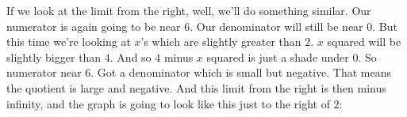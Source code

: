 \documentclass[pdftex, brazil, 12pt, twoside]{article}
\begin{document}
\begin{figure}[H]
  \begin{center}
  \end{center}
\end{figure}

If we look at the limit from the right,
well, we'll do something similar.
Our numerator is again going to be near $6$.
Our denominator will still be near $0$.
But this time we're looking at $x$'s which
are slightly greater than $2$.
$x$ squared will be slightly bigger than $4$.
And so $4$ minus $x$ squared is just a shade under $0$.
So numerator near $6$.
Got a denominator which is small but negative.
That means the quotient is large and negative.
And this limit from the right is then minus infinity,
and the graph is going to look like this just
to the right of $2$:

\begin{figure}[H]
  \begin{center}
  \end{center}
\end{figure}
\end{document}
